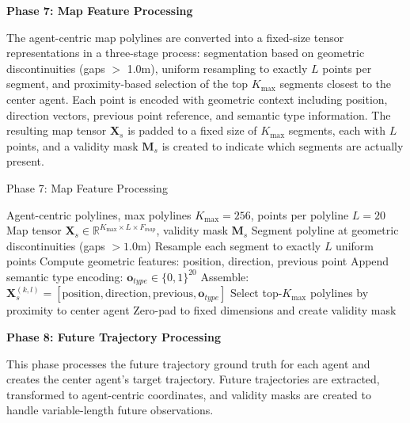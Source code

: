 \textbf{Phase 7: Map Feature Processing}

The agent-centric map polylines are converted into a fixed-size tensor representations in a three-stage process: segmentation based on geometric discontinuities (gaps \(>\) 1.0m), uniform resampling to exactly \(L\) points per segment, and proximity-based selection of the top \(K_{\max}\) segments closest to the center agent. Each point is encoded with geometric context including position, direction vectors, previous point reference, and semantic type information. The resulting map tensor \(\boldsymbol{X}_s\) is padded to a fixed size of \(K_{\max}\) segments, each with \(L\) points, and a validity mask \(\boldsymbol{M}_s\) is created to indicate which segments are actually present.

\begin{algorithm}[H]
\caption{Phase 7: Map Feature Processing}
\label{alg:phase7_map_features}
\begin{algorithmic}[1]
\REQUIRE Agent-centric polylines, max polylines \(K_{\max} = 256\), points per polyline \(L = 20\)
\ENSURE Map tensor \(\boldsymbol{X}_s \in \mathbb{R}^{K_{\max} \times L \times F_{map}}\), validity mask \(\boldsymbol{M}_s\)
    \STATE Segment polyline at geometric discontinuities (gaps \(> 1.0\)m)
    \STATE Resample each segment to exactly \(L\) uniform points
    \STATE Compute geometric features: position, direction, previous point
    \STATE Append semantic type encoding: \(\boldsymbol{o}_{type} \in \{0,1\}^{20}\)
    \STATE Assemble: \(\boldsymbol{X}_s^{(k,l)} = [\text{position}, \text{direction}, \text{previous}, \boldsymbol{o}_{type}]\)
\ENDFOR
\STATE Select top-\(K_{\max}\) polylines by proximity to center agent
\STATE Zero-pad to fixed dimensions and create validity mask
\end{algorithmic}
\end{algorithm}

\textbf{Phase 8: Future Trajectory Processing}

This phase processes the future trajectory ground truth for each agent and creates the center agent's target trajectory. Future trajectories are extracted, transformed to agent-centric coordinates, and validity masks are created to handle variable-length future observations.

